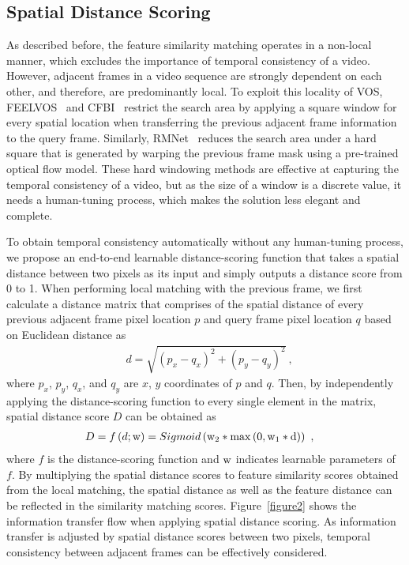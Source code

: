 \documentclass[runningheads]{llncs}
\begin{document}
\subsection{Spatial Distance Scoring}
As described before, the feature similarity matching operates in a non-local manner, which excludes the importance of temporal consistency of a video. However, adjacent frames in a video sequence are strongly dependent on each other, and therefore, are predominantly local. To exploit this locality of VOS, FEELVOS~\cite{FEELVOS} and CFBI~\cite{CFBI} restrict the search area by applying a square window for every spatial location when transferring the previous adjacent frame information to the query frame. Similarly, RMNet~\cite{RMNet} reduces the search area under a hard square that is generated by warping the previous frame mask using a pre-trained optical flow model. These hard windowing methods are effective at capturing the temporal consistency of a video, but as the size of a window is a discrete value, it needs a human-tuning process, which makes the solution less elegant and complete. 


To obtain temporal consistency automatically without any human-tuning process, we propose an end-to-end learnable distance-scoring function that takes a spatial distance between two pixels as its input and simply outputs a distance score from 0 to 1. When performing local matching with the previous frame, we first calculate a distance matrix that comprises of the spatial distance of every previous adjacent frame pixel location $p$ and query frame pixel location $q$ based on Euclidean distance as
\begin{align}
&d = \sqrt{\left(p_x - q_x\right) ^ 2 + \left(p_y - q_y\right) ^ 2}~,
\end{align}
where $p_x$, $p_y$, $q_x$, and $q_y$ are $x$, $y$ coordinates of $p$ and $q$. Then, by independently applying the distance-scoring function to every single element in the matrix, spatial distance score $D$ can be obtained as
\begin{align}
&D = f\left(d; \rm{w}\right) = Sigmoid\left(\rm{w_2} * max\left(0, \rm{w_1} * d\right)\right)~,
\end{align}
where $f$ is the distance-scoring function and $\rm{w}$ indicates learnable parameters of $f$. By multiplying the spatial distance scores to feature similarity scores obtained from the local matching, the spatial distance as well as the feature distance can be reflected in the similarity matching scores. Figure~\ref{figure2} shows the information transfer flow when applying spatial distance scoring. As information transfer is adjusted by spatial distance scores between two pixels, temporal consistency between adjacent frames can be effectively considered.
\end{document}
